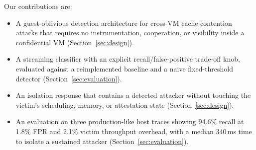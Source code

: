 Our contributions are:
\begin{itemize}[leftmargin=1.4em]
  \item A guest-oblivious detection architecture for cross-VM cache contention attacks that
  requires no instrumentation, cooperation, or visibility inside a confidential VM
  (Section~\ref{sec:design}).
  \item A streaming classifier with an explicit recall/false-positive trade-off knob, evaluated
  against a reimplemented \baseline{} baseline and a naive fixed-threshold detector
  (Section~\ref{sec:evaluation}).
  \item An isolation response that contains a detected attacker without touching the victim's
  scheduling, memory, or attestation state (Section~\ref{sec:design}).
  \item An evaluation on three production-like host traces showing 94.6\% recall at 1.8\% FPR
  and 2.1\% victim throughput overhead, with a median 340\,ms time to isolate a sustained
  attacker (Section~\ref{sec:evaluation}).
\end{itemize}
